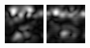 \begin{figure}[ht]
\begin{center}
 \includegraphics[width=\columnwidth/9]{ch4/figures/mag_0_3.jpg}
 \includegraphics[width=\columnwidth/9]{ch4/figures/mag_0_4.jpg}

\end{center}
\end{figure}
